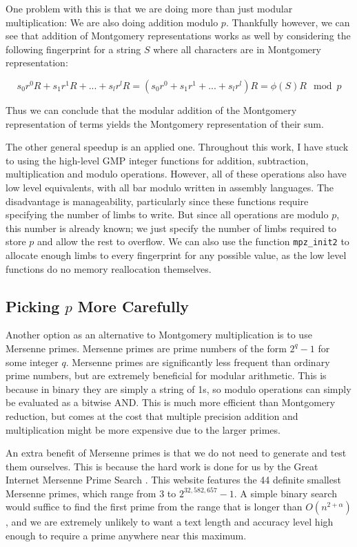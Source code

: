 \documentclass[ %
                    author={Dominic Joseph Moylett},
                    degree={MEng},
                     title={Dictionary Matching with Fingerprints},
                  subtitle={An Empirical Analysis},
                      type={research},
                      year={2015} ]{dissertation}
\begin{document}
One problem with this is that we are doing more than just modular multiplication: We are also doing addition modulo $p$. Thankfully however, we can see that addition of Montgomery representations works as well by considering the following fingerprint for a string $S$ where all characters are in Montgomery representation:

$$s_0r^0R + s_1r^1R + ... + s_lr^lR = (s_0r^0 + s_1r^1 + ... + s_lr^l)R = \phi(S)R \mod p$$

Thus we can conclude that the modular addition of the Montgomery representation of terms yields the Montgomery representation of their sum.

The other general speedup is an applied one. Throughout this work, I have stuck to using the high-level GMP integer functions for addition, subtraction, multiplication and modulo operations. However, all of these operations also have low level equivalents, with all bar modulo written in assembly languages. The disadvantage is manageability, particularly since these functions require specifying the number of limbs to write. But since all operations are modulo $p$, this number is already known; we just specify the number of limbs required to store $p$ and allow the rest to overflow. We can also use the function \texttt{mpz\_init2} to allocate enough limbs to every fingerprint for any possible value, as the low level functions do no memory reallocation themselves.

\subsection{Picking $p$ More Carefully}
\label{ssec:pick-p}

Another option as an alternative to Montgomery multiplication is to use Mersenne primes. Mersenne primes are prime numbers of the form $2^q - 1$ for some integer $q$. Mersenne primes are significantly less frequent than ordinary prime numbers, but are extremely beneficial for modular arithmetic. This is because in binary they are simply a string of 1s, so modulo operations can simply be evaluated as a bitwise AND. This is much more efficient than Montgomery reduction, but comes at the cost that multiple precision addition and multiplication might be more expensive due to the larger primes.

An extra benefit of Mersenne primes is that we do not need to generate and test them ourselves. This is because the hard work is done for us by the Great Internet Mersenne Prime Search \cite{website:gimps-known}. This website features the 44 definite smallest Mersenne primes, which range from 3 to $2^{32,582,657}-1$. A simple binary search would suffice to find the first prime from the range that is longer than $O(n^{2 + \alpha})$, and we are extremely unlikely to want a text length and accuracy level high enough to require a prime anywhere near this maximum.
\end{document}
